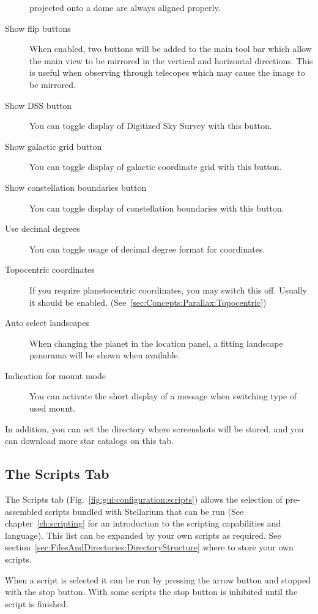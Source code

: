 \begin{description}
  projected onto a dome are always aligned properly.
\item[Show flip buttons] When enabled, two buttons will be added to
  the main tool bar which allow the main view to be mirrored in the
  vertical and horizontal directions. This is useful when observing
  through telecopes which may cause the image to be mirrored.
\item[Show DSS button] You can toggle display of Digitized Sky Survey with this button.
\item[Show galactic grid button] You can toggle display of galactic coordinate grid with this button.
\item[Show constellation boundaries button] You can toggle display of constellation boundaries with this button.
\item[Use decimal degrees] You can toggle usage of decimal degree format for coordinates.
\item[Topocentric coordinates] If you require planetocentric coordinates, you may switch this off. 
  Usually it should be enabled. (See~\ref{sec:Concepts:Parallax:Topocentric})
\item[Auto select landscapes] When changing the planet in the location
  panel, a fitting landscape panorama will be shown when available.
\item[Indication for mount mode] You can activate the short display of a message when switching type of used mount.
\end{description}

\noindent In addition, you can set the directory where screenshots will be stored, 
and you can download more star catalogs on this tab.

\subsection{The Scripts Tab}
\label{sec:gui:scripts}


The Scripts tab (Fig.~\ref{fig:gui:configuration:scripts}) allows the
selection of pre-assembled scripts bundled with Stellarium that can be
run (See chapter~\ref{ch:scripting} for an introduction to the
scripting capabilities and language). This list can be expanded by
your own scripts as required. See
section~\ref{sec:FilesAndDirectories:DirectoryStructure} where to
store your own scripts.

When a script is selected it can be run by pressing the arrow button
and stopped with the stop button. With some scripts the stop button is
inhibited until the script is finished. %

